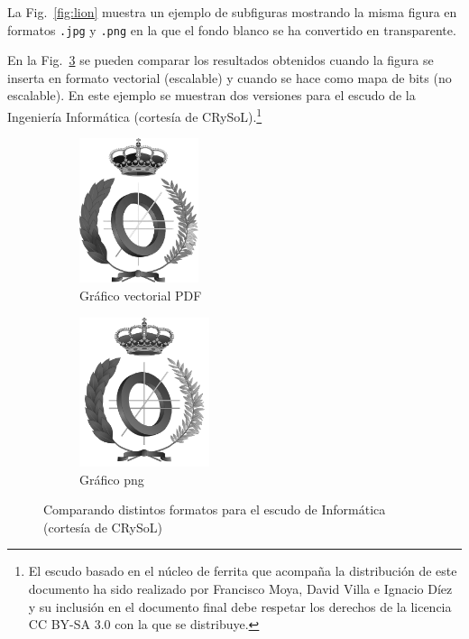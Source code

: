 \documentclass[11pt,a4paper]{article}
\begin{document}
La Fig.~\ref{fig:lion} muestra un ejemplo de subfiguras mostrando la misma figura en formatos \texttt{.jpg} y \texttt{.png} en la que el fondo blanco se ha convertido en transparente. 

En la Fig.~\ref{fig:escudo} se pueden comparar los resultados obtenidos cuando la figura se inserta en formato vectorial (escalable) y cuando se hace como mapa de bits (no escalable). En este ejemplo se muestran dos versiones para el escudo de la Ingeniería Informática (cortesía de CRySoL).\footnote{El escudo basado en el núcleo de ferrita que acompaña la distribución de este documento ha sido realizado por Francisco Moya, David Villa e Ignacio Díez y su inclusión en el documento final debe respetar los derechos de la licencia CC BY-SA 3.0 con la que se distribuye.}


\begin{figure}[hbt]
	\centering
	\begin{subfigure}[b]{0.4\linewidth}
		\centering
		\includegraphics[width=3.5cm]{escudoInfBW.pdf}
		\caption{Gráfico vectorial PDF}\label{fig:escudoPDF}
	\end{subfigure}
	\begin{subfigure}[b]{0.4\linewidth}
		\centering
		\includegraphics[width=3.8cm]{escudoInfBW.png}
		\caption{Gráfico png}\label{fig:escudoPNG}
	\end{subfigure}
	\caption[Comparación PDF y png]{Comparando distintos formatos para el escudo de Informática (cortesía de CRySoL)}
	\label{fig:escudo}
\end{figure}
\end{document}
